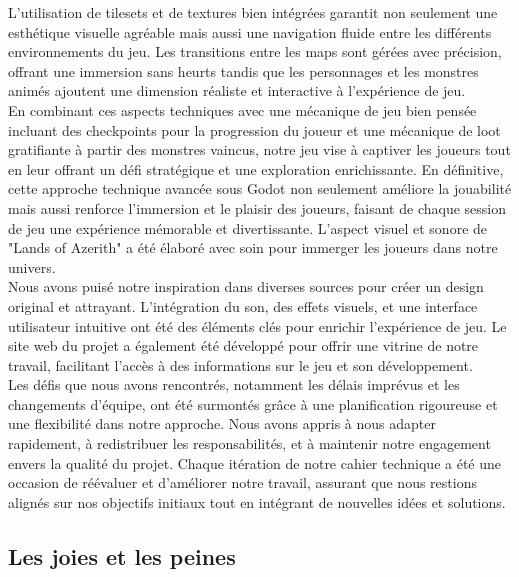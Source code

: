  L'utilisation de tilesets et de textures bien intégrées garantit non seulement une esthétique visuelle agréable 
 mais aussi une navigation fluide entre les différents environnements du jeu. Les transitions entre les maps sont gérées
  avec précision, offrant une immersion sans heurts tandis que les personnages et les monstres animés ajoutent une dimension réaliste et interactive à l'expérience de jeu.
 \\

 En combinant ces aspects techniques avec une mécanique de jeu bien pensée incluant des checkpoints pour la progression du joueur et une mécanique de loot gratifiante 
 à partir des monstres vaincus, notre jeu vise à captiver les joueurs tout en leur offrant un défi stratégique et une exploration enrichissante. En définitive, cette
  approche technique avancée sous Godot non seulement améliore la jouabilité mais aussi renforce l'immersion et le plaisir des joueurs, faisant de chaque session de jeu une 
  expérience mémorable et divertissante.
L'aspect visuel et sonore de "Lands of Azerith" a été élaboré avec soin pour immerger les joueurs dans notre univers.
\\

Nous avons puisé notre inspiration dans diverses sources pour créer un design original et attrayant.
L'intégration du son, des effets visuels, et une interface utilisateur intuitive ont été des éléments clés pour enrichir l'expérience de jeu.
Le site web du projet a également été développé pour offrir une vitrine de notre travail, facilitant l'accès à des informations sur le jeu et son développement.
\\

Les défis que nous avons rencontrés, notamment les délais imprévus et les changements d'équipe, ont été surmontés grâce à une planification rigoureuse
et une flexibilité dans notre approche. Nous avons appris à nous adapter rapidement, à redistribuer les responsabilités, et à maintenir notre engagement
envers la qualité du projet. Chaque itération de notre cahier technique a été une occasion de réévaluer et d'améliorer notre travail, assurant que nous
restions alignés sur nos objectifs initiaux tout en intégrant de nouvelles idées et solutions.
\\

\subsection{Les joies et les peines}

